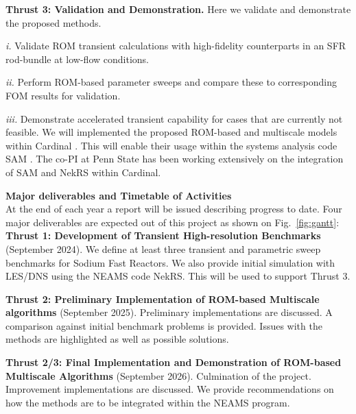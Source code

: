 \textbf{Thrust 3: Validation and Demonstration.} 
Here we validate and demonstrate the proposed methods.
\\[-5ex]
\begin{description}
\item{\em i.}
Validate ROM transient calculations with high-fidelity counterparts
in an SFR rod-bundle at low-flow conditions.
\\[-4ex]
\item{\em ii.}
Perform ROM-based parameter sweeps and compare these to corresponding
FOM results for validation.
\\[-4ex]
\item{\em iii.}
Demonstrate accelerated transient capability for cases that are currently not
feasible. We will implemented the proposed ROM-based and multiscale models within Cardinal \cite{cardinal}. This will enable their usage within the systems analysis code SAM \cite{hu2021}. The co-PI at Penn State has been working extensively on the integration of SAM and NekRS within Cardinal.
\\[-3ex]
\end{description}

\textbf{Major deliverables and Timetable of Activities} \\
At the end of each year a report will be issued describing progress to date.
Four major deliverables are expected out of this project as shown on
Fig.~\ref{fig:gantt}: \\

\vspace*{-.10in}
\noindent \textbf{Thrust 1: Development of Transient High-resolution
Benchmarks} (September 2024). We define at least three transient and parametric
sweep benchmarks for Sodium Fast Reactors. We also provide initial simulation
with LES/DNS using the NEAMS code NekRS. This will be used to support Thrust 3.

\noindent \textbf{Thrust 2: Preliminary Implementation of ROM-based Multiscale
algorithms} (September 2025). Preliminary implementations are discussed. A
comparison against initial benchmark problems is provided. Issues with the
methods are highlighted as well as possible solutions.

\noindent \textbf{Thrust 2/3: Final Implementation and Demonstration of
ROM-based Multiscale Algorithms} (September 2026). 
Culmination of the project. Improvement implementations are discussed. We
provide recommendations on how the methods are to be integrated within the
NEAMS program.

